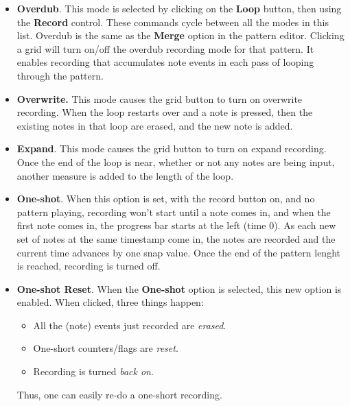    \begin{itemize}
      \item \textbf{Overdub}.
         This mode is selected by clicking on the \textbf{Loop} button,
         then using the \textbf{Record} control.
         These commands cycle between all the modes in this list.
         Overdub is the same as the \textbf{Merge} option in the 
         pattern editor.
         Clicking a grid will turn on/off the overdub recording mode
         for that pattern.
         It enables recording that accumulates note events in each pass of
         looping through the pattern.
      \item \textbf{Overwrite.}
         This mode causes the grid button to turn on overwrite recording.
         When the loop restarts over and a note is pressed,
         then the existing notes in that loop are erased,
         and the new note is added.
      \item \textbf{Expand}.
         This mode causes the grid button to turn on expand recording.
         Once the end of the loop is near, whether or
         not any notes are being input, another measure is added to the length
         of the loop.
      \item \textbf{One-shot}.
         When this option is set, with the record button on, and no pattern
         playing, recording won't start until a note comes in, and when the
         first note comes in, the progress bar starts at the left (time 0).
         As each new set of notes at the same timestamp come in, the
         notes are recorded and the current time advances by one snap value.
         Once the end of the pattern lenght is reached, recording is turned
         off.
      \item \textbf{One-shot Reset}.
         When the \textbf{One-shot} option is selected, this new option
         is enabled.
         When clicked, three things happen:
         \begin{itemize}
            \item All the (note) events just recorded are \textsl{erased}.
            \item One-short counters/flags are \textsl{reset}.
            \item Recording is turned \textsl{back on}.
         \end{itemize}
         Thus, one can easily re-do a one-short recording.
   \end{itemize}

